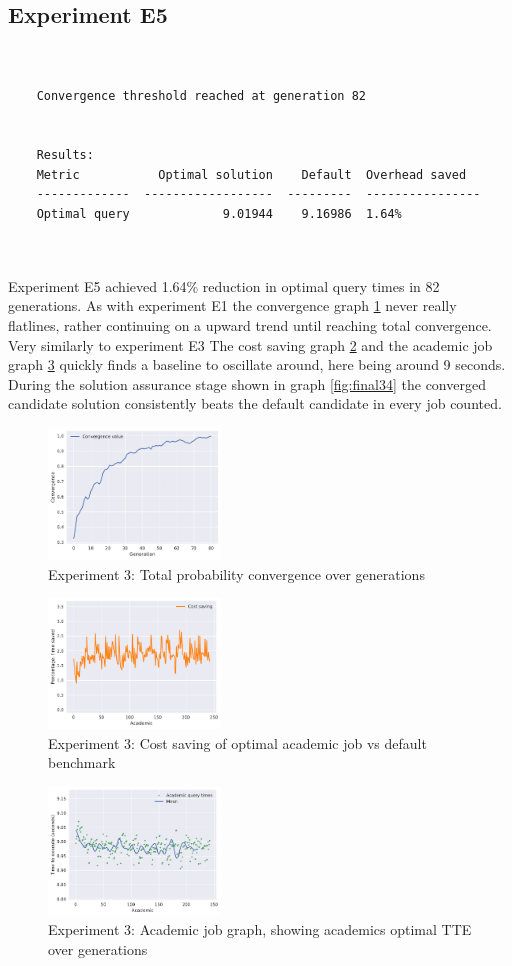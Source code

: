 \documentclass[a4paper,english]{report}
\begin{document}
	\subsection{Experiment E5}
	\begin{verbatim}
	
	
	Convergence threshold reached at generation 82
	
	
	Results:
	Metric           Optimal solution    Default  Overhead saved
	-------------  ------------------  ---------  ----------------
	Optimal query             9.01944    9.16986  1.64%

	
	\end{verbatim}
	Experiment E5 achieved 1.64\% reduction in optimal query times in 82 generations. As with experiment E1 the convergence graph \ref{fig:final31} never really flatlines, rather continuing on a upward trend until reaching total convergence. Very similarly to experiment E3 The cost saving graph \ref{fig:final32} and the academic job graph \ref{fig:final33} quickly finds a baseline to oscillate around, here being around 9 seconds. During the solution assurance stage shown in graph \ref{fig:final34} the converged candidate solution consistently beats the default candidate in every job counted.
	\clearpage 
	\begin{figure}[H]
		\centering
		\includegraphics[width=130pt]{runlogs/final9/1}
		\caption{Experiment 3: Total probability convergence over generations}
		\label{fig:final31}
	\end{figure}
	\begin{figure}[H]
		\centering
		\includegraphics[width=130pt]{runlogs/final9/2}
		\caption{Experiment 3: Cost saving of optimal academic job vs default benchmark}
		\label{fig:final32}
	\end{figure}
	\begin{figure}[H]
		\centering
		\includegraphics[width=130pt]{runlogs/final9/3}
		\caption{Experiment 3: Academic job graph, showing academics optimal TTE over generations}
		\label{fig:final33}
	\end{figure}
\end{document}
